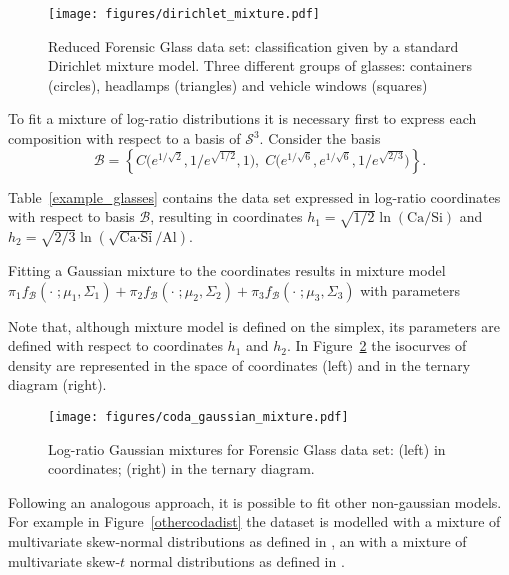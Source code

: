 \documentclass[12pt, a4paper]{article}
\begin{document}
\begin{figure}[htbp]
\centering
\texttt{[image: figures/dirichlet\_mixture.pdf]}
\caption{Reduced Forensic Glass data set: classification given by a standard Dirichlet mixture model. Three different groups of glasses: containers (circles), headlamps (triangles) and vehicle windows (squares)}
\label{fig06fittingdirichlet}
\end{figure}

To fit a mixture of log-ratio distributions it is necessary first to express each composition with respect to a basis of $\mathcal{S}^3$. Consider the basis 
\[
\mathcal{B} = \left\{ C\Big( e^{1/\sqrt{2}}, 1/e^{\sqrt{1/2}}, 1 \Big), \; C\Big( e^{1/\sqrt{6}}, e^{1/\sqrt{6}}, 1/e^{\sqrt{2/3}} \Big) \right\}.
\]

Table~\ref{example_glasses} contains the data set expressed in log-ratio coordinates with respect to basis $\mathcal{B}$, resulting in coordinates $h_1 = \sqrt{1/2} \ln(\text{Ca}/\text{Si})$ and $h_2 = \sqrt{2/3} \ln(\sqrt{\text{Ca} \cdot \text{Si}} / \text{Al})$.



Fitting a Gaussian mixture to the coordinates results in mixture model
$
\pi_1 f_{\mathcal{B}}(\cdot\;; \mu_1, \Sigma_1) + \pi_2 f_{\mathcal{B}}(\cdot\;; \mu_2, \Sigma_2) + \pi_3 f_{\mathcal{B}}(\cdot\;; \mu_3, \Sigma_3)
$
with parameters

{\small  }

Note that, although mixture model is defined on the simplex, its parameters are defined with respect to coordinates $h_1$ and $h_2$. In Figure~\ref{fig07fittingcodaGaussian} the isocurves of density are represented in the space
of coordinates (left) and in the ternary diagram (right).

\begin{figure}[htbp]
\centering
\texttt{[image: figures/coda\_gaussian\_mixture.pdf]}\\
\caption{Log-ratio Gaussian mixtures for Forensic Glass data set: (left) in coordinates; (right) in the ternary diagram.}
\label{fig07fittingcodaGaussian}
\end{figure}



Following an analogous approach, it is possible to fit other non-gaussian models. For example in Figure~\ref{othercodadist} the dataset is modelled with a mixture of multivariate skew-normal distributions as defined in \citep{prates2013mixsmsn}, an with a mixture of multivariate skew-$t$ normal distributions as defined in \citep{mclachlan2013emmixuskew}.
\end{document}
